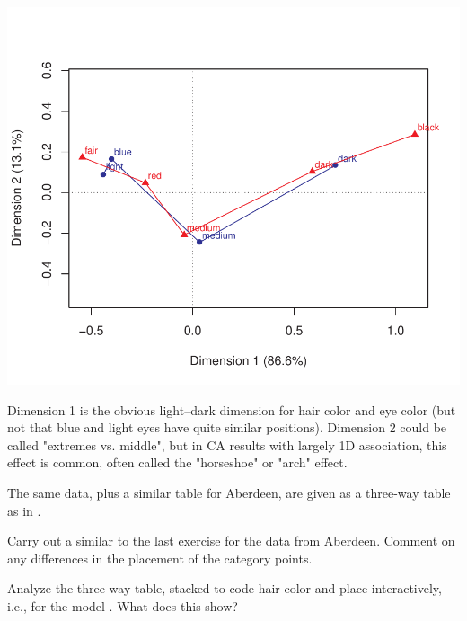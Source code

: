 \documentclass[10pt]{report}\usepackage[]{graphicx}\usepackage[]{color}
\newenvironment{knitrout}{}{} %
\renewenvironment{knitrout}{\small\renewcommand{\baselinestretch}{.85}}{} %
\begin{document}
\begin{Exercises}
\begin{enumerate*}
\begin{ans}
\begin{knitrout}
\centerline{\includegraphics[width=.5\textwidth]{soln/fig/ex6_4b-1} }



\end{knitrout}

Dimension 1 is the obvious light--dark dimension for hair color and eye color (but not that blue and light eyes have quite 
similar positions).  Dimension 2 could be called "extremes vs. middle", but in CA results with largely 1D association,
this effect is common, often called the "horseshoe" or "arch" effect.
    \end{ans}
    
  \end{enumerate*}
  
  \exercise The same data, plus a similar table for Aberdeen, are given as a
  three-way table as  in .
  \begin{enumerate*}
    \item Carry out a similar \ca  to the last exercise 
    for the data from Aberdeen.  
    Comment on any differences in the
    placement of the category points.
    \begin{ans}
    \end{ans}
    
    \item Analyze the three-way table, stacked to code hair color and
    place interactively, i.e., for the \loglin model .
    What does this show?
    \begin{ans}
    \end{ans}
    
  \end{enumerate*}
  

\end{Exercises}
\end{document}
